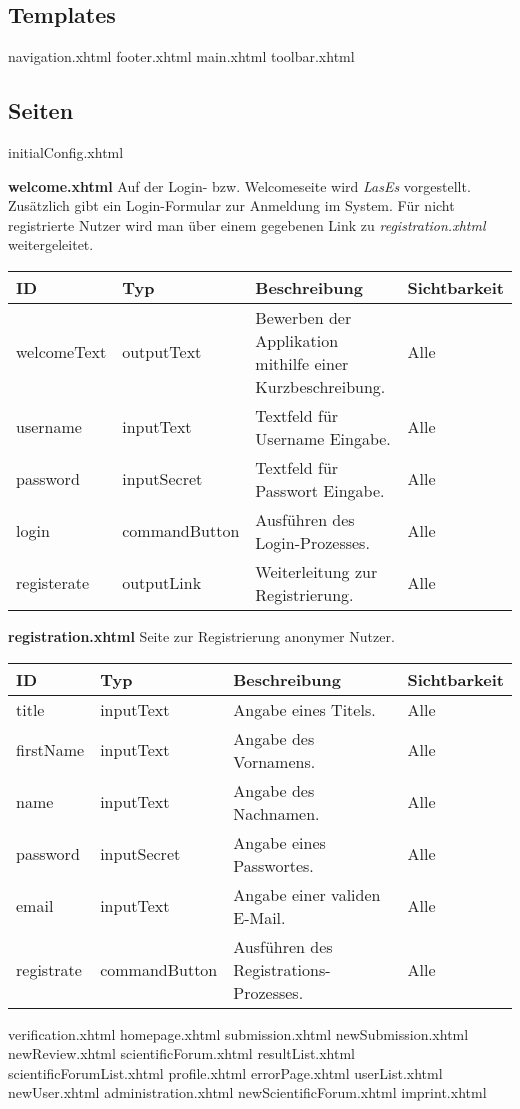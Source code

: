 
\subsection{Templates}
navigation.xhtml
footer.xhtml
main.xhtml
toolbar.xhtml

\subsection{Seiten}
initialConfig.xhtml

\textbf{welcome.xhtml} Auf der Login- bzw. Welcomeseite wird \emph{LasEs} vorgestellt.
Zusätzlich gibt ein Login-Formular zur Anmeldung im System.
Für nicht registrierte Nutzer wird man über einem gegebenen Link zu \emph{registration.xhtml} weitergeleitet.


\begin{tabular}[H]{|m{3cm}|m{3cm}|m{6cm}|m{2cm}|}
    \hline
    \textbf{ID} & \textbf{Typ} & \textbf{Beschreibung} & \textbf{Sichtbarkeit} \\
    \hline
    \hline
    welcomeText & outputText & Bewerben der Applikation mithilfe einer Kurzbeschreibung. & Alle \\
    \hline
    username & inputText & Textfeld für Username Eingabe. & Alle \\
    \hline
    password & inputSecret & Textfeld für Passwort Eingabe. & Alle \\
    \hline
    login & commandButton & Ausführen des Login-Prozesses. & Alle \\
    \hline
    registerate & outputLink & Weiterleitung zur Registrierung. & Alle \\
    \hline
\end{tabular}

\textbf{registration.xhtml} Seite zur Registrierung anonymer Nutzer.

\begin{tabular}[H]{|m{3cm}|m{3cm}|m{6cm}|m{2cm}|}
    \hline
    \textbf{ID} & \textbf{Typ} & \textbf{Beschreibung} & \textbf{Sichtbarkeit} \\
    \hline
    \hline
    title & inputText & Angabe eines Titels. & Alle \\
    \hline
    firstName & inputText & Angabe des Vornamens. & Alle \\
    \hline
    name & inputText & Angabe des Nachnamen. & Alle \\
    \hline
    password & inputSecret & Angabe eines Passwortes. & Alle \\
    \hline
    email & inputText & Angabe einer validen E-Mail. & Alle \\
    \hline
    registrate & commandButton & Ausführen des Registrations-Prozesses. & Alle \\
    \hline
\end{tabular}

verification.xhtml
homepage.xhtml
submission.xhtml
newSubmission.xhtml
newReview.xhtml
scientificForum.xhtml
resultList.xhtml
scientificForumList.xhtml
profile.xhtml
errorPage.xhtml
userList.xhtml
newUser.xhtml
administration.xhtml
newScientificForum.xhtml
imprint.xhtml

